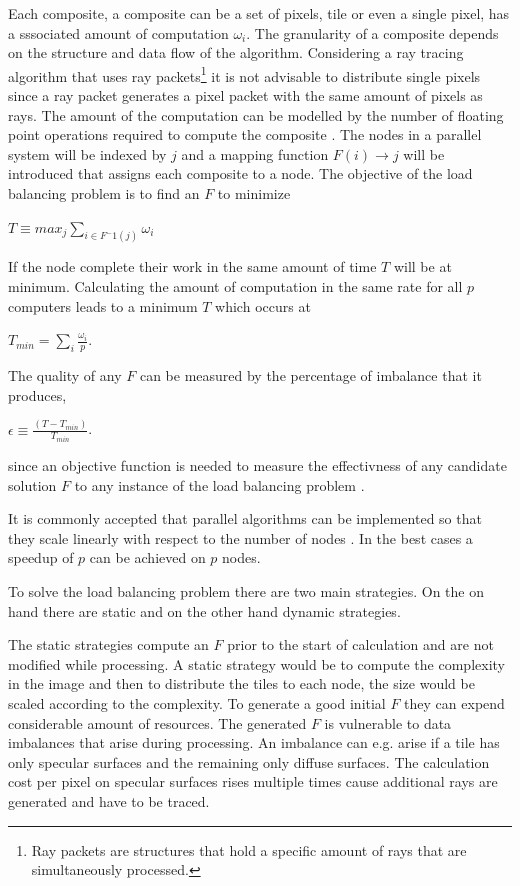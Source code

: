 \documentclass[DIV10, abstracton, openright, footsepline, headsepline, twoside, 9pt,
bigheadings]{scrreprt}
\begin{document}
Each composite, a composite can be a set of pixels, tile or even a single
pixel, has a sssociated amount of computation $\omega_i$. The granularity of
a composite depends on the structure and data flow of the algorithm.
Considering a ray tracing algorithm that uses ray packets\footnote{Ray packets
are structures that hold a specific amount of rays that are simultaneously
processed.} it is not advisable to distribute single pixels since a ray packet
generates a pixel packet with  the same amount of pixels as rays. The amount of
the computation can be modelled by the number of floating point operations
required to compute the composite \cite{Heirich96}.
The nodes in a parallel system will be indexed by $j$ and a mapping function
$F(i)\rightarrow j$ will be introduced that assigns each composite to a node.
The objective of the load balancing problem is to find an $F$ to minimize
\begin{center}
$T \equiv max_j \sum_{i \in F^-1(j)} \omega_i$
\end{center}
If the node complete their work in the same amount of time $T$ will be at
minimum. Calculating the amount of computation in the same rate for all $p$
computers leads to a minimum $T$ which occurs at
\begin{center}
$T_{min} = \sum_i \frac{\omega_i}{p}$.
\end{center}
The quality of any $F$ can be measured by the percentage of imbalance that it
produces,
\begin{center}
$\epsilon \equiv \frac{(T - T_{min})}{T_{min}}$.
\end{center}
since an objective function is needed to measure the effectivness of any
candidate solution $F$ to any instance of the load balancing
problem \cite{Heirich198} \cite{Heirich298} \cite{Ghosh98}.

It is commonly accepted that parallel algorithms can be implemented so that
they scale linearly with respect to the number of nodes \cite{Basket93}. In
the best cases a speedup of $p$ can be achieved on $p$ nodes.

To solve the load balancing problem there are two main strategies. On the on
hand there are static and on the other hand dynamic strategies.


The static strategies compute an $F$ prior to the start of calculation and are
not modified while processing. A static strategy would be to compute the
complexity in the image and then to distribute the tiles to each node, the size
would be scaled according to the complexity. To generate a good initial
$F$ they can expend considerable amount of resources. The generated $F$ is
vulnerable to data imbalances that arise during processing. An imbalance can
e.g. arise if a tile has only specular surfaces and the remaining only diffuse
surfaces. The calculation cost per pixel on specular surfaces rises multiple
times cause additional rays are generated and have to be traced.
\end{document}
